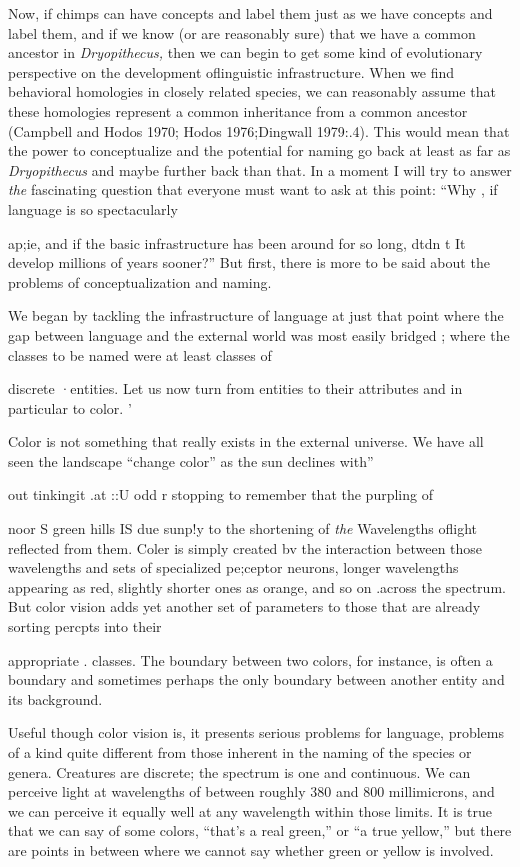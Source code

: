 Now, if chimps can have concepts and label them just as we have concepts and label them, and if we know (or are reasonably sure) that we have a common ancestor in \textit{Dryopithecus,} then we can begin to get some kind of evolutionary perspective on the development oflinguistic infrastructure. When we find behavioral homologies in closely related species, we can reasonably assume that these homologies represent a common inheritance from a common ancestor (Campbell and Hodos 1970; Hodos 1976;Dingwall 1979:.4). This would mean that the power to conceptualize and the potential for naming go back at least as far as \textit{Dryopithecus} and maybe further back than that. In a moment I will try to answer \textit{the} fascinating question that everyone must want to ask at this point: ``Why , if language is so spectacularly

ap;ie, and if the basic infrastructure has been around for so long, dtdn t It develop millions of years sooner?'' But first, there is more to be said about the problems of conceptualization and naming.

We began by tackling the infrastructure of language at just that point where the gap between language and the external world was most easily bridged ; where the classes to be named were at least classes of

discrete ·entities. Let us now turn from entities to their attributes and in particular to color. '

Color is not something that really exists in the external universe. We have all seen the landscape ``change color'' as the sun declines with''

out tinkingit .at ::U odd r stopping to remember that the purpling of

noor S green hills IS due sunp!y to the shortening of \textit{the} Wavelengths oflight reflected from them. Coler is simply created bv the interaction between those wavelengths and sets of specialized pe;ceptor neurons, longer wavelengths appearing as red, slightly shorter ones as orange, and so on .across the spectrum. But color vision adds yet another set
 of parameters to those that are already sorting percpts into their 

appropriate . classes. The boundary between two colors, for instance, is often a boundary and sometimes perhaps the only boundary between another entity and its background.

Useful though color vision is, it presents serious problems for language, problems of a kind quite different from those inherent in the naming of the species or genera. Creatures are discrete; the spec\-trum is one and continuous. We can perceive light at wavelengths of between roughly 380 and 800 millimicrons, and we can perceive it equally well at any wavelength within those limits. It is true that we can say of some colors, ``that's a real green,'' or ``a true yellow,'' but there are points in between where we cannot say whether green or yellow is involved.

